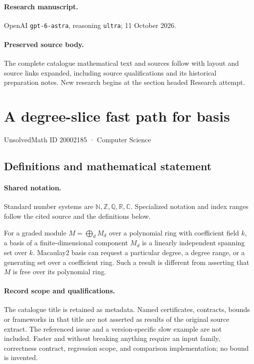 \documentclass[11pt]{article}
\begin{document}
\paragraph{Research manuscript.} OpenAI \texttt{gpt-6-astra}, reasoning \texttt{ultra}; 11 October 2026.
\paragraph{Preserved source body.} The complete catalogue mathematical text and sources follow with layout and source links expanded, including source qualifications and its historical preparation notes. New research begins at the section headed Research attempt.

\section{A degree-slice fast path for basis}\label{20002185}
{\small UnsolvedMath ID 20002185 · Computer Science}
\subsection{Definitions and mathematical statement}

\paragraph{Shared notation.}Standard number systems are $\mathbb N,\mathbb Z,\mathbb Q,\mathbb R,\mathbb C$. Specialized notation and index ranges follow the cited source and the definitions below.


For a graded module $M=\bigoplus_d M_d$ over a polynomial ring with coefficient field $k$, a basis of a finite-dimensional component $M_d$ is a linearly independent spanning set over $k$. Macaulay2 basis can request a particular degree, a degree range, or a generating set over a coefficient ring. Such a result is different from asserting that $M$ is free over its polynomial ring.
\paragraph{Record scope and qualifications.}
The catalogue title is retained as metadata. Named certificates, contracts, bounds or frameworks in that title are not asserted as results of the original source extract.
The referenced issue and a version-specific slow example are not included. Faster and without breaking anything require an input family, correctness contract, regression scope, and comparison implementation; no bound is invented.
\end{document}
